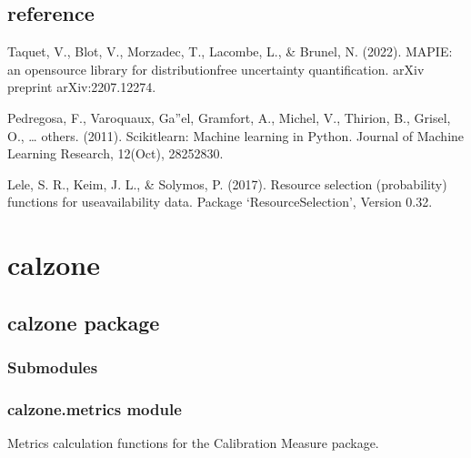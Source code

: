 \documentclass[letterpaper,10pt,english]{sphinxmanual}
\begin{document}
\section{reference}
\label{\detokenize{notebooks/validation:reference}}
\sphinxAtStartPar
Taquet, V., Blot, V., Morzadec, T., Lacombe, L., \& Brunel, N. (2022). MAPIE: an open\sphinxhyphen{}source library for distribution\sphinxhyphen{}free uncertainty quantification. arXiv preprint arXiv:2207.12274.

\sphinxAtStartPar
Pedregosa, F., Varoquaux, Ga”el, Gramfort, A., Michel, V., Thirion, B., Grisel, O., … others. (2011). Scikit\sphinxhyphen{}learn: Machine learning in Python. Journal of Machine Learning Research, 12(Oct), 2825\textendash{}2830.

\sphinxAtStartPar
Lele, S. R., Keim, J. L., \& Solymos, P. (2017). Resource selection (probability) functions for use\sphinxhyphen{}availability data. Package ‘ResourceSelection’, Version 0.3\sphinxhyphen{}2.

\sphinxstepscope


\chapter{calzone}
\label{\detokenize{modules:calzone}}\label{\detokenize{modules::doc}}
\sphinxstepscope


\section{calzone package}
\label{\detokenize{calzone:calzone-package}}\label{\detokenize{calzone::doc}}

\subsection{Submodules}
\label{\detokenize{calzone:submodules}}

\subsection{calzone.metrics module}
\label{\detokenize{calzone:module-calzone.metrics}}\label{\detokenize{calzone:calzone-metrics-module}}
\sphinxAtStartPar
Metrics calculation functions for the Calibration Measure package.
\end{document}
